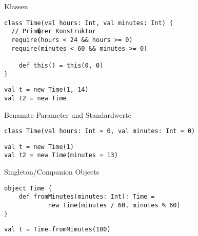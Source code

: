 \documentclass[14pt,aspectratio=169,trans]{beamer} %
\begin{document}
\begin{frame}[fragile]{}
 \begin{block}{Klassen}
\scriptsize
	\onslide<2->
  \begin{lstlisting}
class Time(val hours: Int, val minutes: Int) {
  // Prim�rer Konstruktor
  require(hours < 24 && hours >= 0)
  require(minutes < 60 && minutes >= 0)
	
	def this() = this(0, 0)
}
	\end{lstlisting}
  \begin{lstlisting}[firstnumber=8]
val t = new Time(1, 14)
val t2 = new Time
	\end{lstlisting}
\end{block}
\end{frame}

\begin{frame}[fragile]{}
 \begin{block}{Benannte Parameter und Standardwerte}
\scriptsize
	\onslide<2->
  \begin{lstlisting}
class Time(val hours: Int = 0, val minutes: Int = 0)

	\end{lstlisting}
  \begin{lstlisting}[firstnumber=2]
val t = new Time(1)
val t2 = new Time(minutes = 13)
	\end{lstlisting}
\end{block}
\end{frame}

\begin{frame}[fragile]{}
 \begin{block}{Singleton/Companion Objects}
\scriptsize
	\onslide<2->
  \begin{lstlisting}
object Time {
	def fromMinutes(minutes: Int): Time = 
			new Time(minutes / 60, minutes % 60)
}

	\end{lstlisting}
  \begin{lstlisting}[firstnumber=5]
val t = Time.fromMimutes(100)
	\end{lstlisting}
\end{block}
\end{frame}
\end{document}
